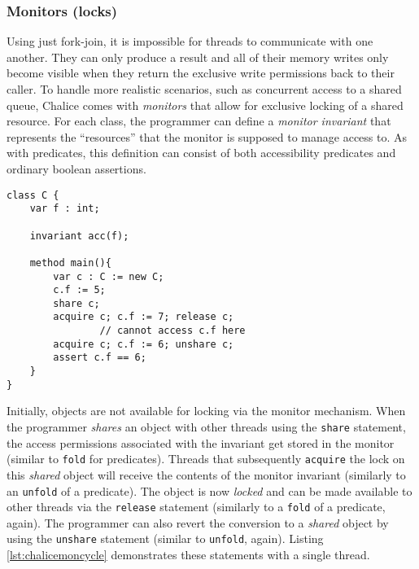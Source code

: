 \subsubsection{Monitors (locks)}\label{sct:back-monitors}
Using just fork-join, it is impossible for threads to communicate with one another. 
They can only produce a result and all of their memory writes only become visible when they return the exclusive write permissions back to their caller.
To handle more realistic scenarios, such as concurrent access to a shared queue, Chalice comes with \emph{monitors} that allow for exclusive locking of a shared resource.
For each class, the programmer can define a \emph{monitor invariant} that represents the ``resources'' that the monitor is supposed to manage access to. 
As with predicates, this definition can consist of both accessibility predicates and ordinary boolean assertions.

\begin{lstlisting}[language=Chalice,float,caption={Example of the life-cycle an object can go through in Chalice},label={lst:chalicemoncycle}]
class C {
    var f : int;

    invariant acc(f);

    method main(){
        var c : C := new C;
        c.f := 5;
        share c;
        acquire c; c.f := 7; release c;
				// cannot access c.f here
        acquire c; c.f := 6; unshare c;
        assert c.f == 6;
    }
}
\end{lstlisting}

Initially, objects are not available for locking via the monitor mechanism.
When the programmer \emph{shares} an object with other threads using the \lstinline[language=Chalice]!share! statement, the access permissions associated with the invariant get stored in the monitor (similar to \lstinline[language=Chalice]!fold! for predicates).
Threads that subsequently \lstinline[language=Chalice]!acquire! the lock on this \emph{shared} object will receive the contents of the monitor invariant (similarly to an \lstinline[language=Chalice]!unfold! of a predicate).
The object is now \emph{locked} and can be made available to other threads via the \lstinline[language=Chalice]!release! statement (similarly to a \lstinline[language=Chalice]!fold! of a predicate, again).
The programmer can also revert the conversion to a \emph{shared} object by using the \lstinline[language=Chalice]!unshare! statement (similar to \lstinline[language=Chalice]!unfold!, again). Listing \ref{lst:chalicemoncycle} demonstrates these statements with a single thread.

